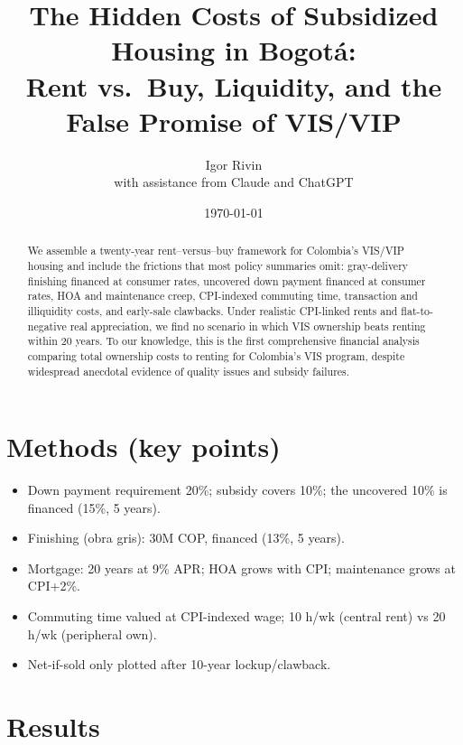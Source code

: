 \documentclass[12pt]{article}
\title{The Hidden Costs of Subsidized Housing in Bogotá:\\
Rent vs.\ Buy, Liquidity, and the False Promise of VIS/VIP}
\author{Igor Rivin\\
\small{with assistance from Claude and ChatGPT}}
\date{\today}
\begin{document}
\maketitle

\begin{abstract}
We assemble a twenty-year rent--versus--buy framework for Colombia's VIS/VIP housing and include the frictions that most policy summaries omit: gray-delivery finishing financed at consumer rates, uncovered down payment financed at consumer rates, HOA and maintenance creep, CPI-indexed commuting time, transaction and illiquidity costs, and early-sale clawbacks. Under realistic CPI-linked rents and flat-to-negative real appreciation, we find no scenario in which VIS ownership beats renting within 20 years. To our knowledge, this is the first comprehensive financial analysis comparing total ownership costs to renting for Colombia's VIS program, despite widespread anecdotal evidence of quality issues and subsidy failures.
\end{abstract}

\section*{Methods (key points)}
\begin{itemize}
  \item Down payment requirement 20\%; subsidy covers 10\%; the uncovered 10\% is financed (15\%, 5 years).
  \item Finishing (obra gris): 30M COP, financed (13\%, 5 years).
  \item Mortgage: 20 years at 9\% APR; HOA grows with CPI; maintenance grows at CPI+2\%.
  \item Commuting time valued at CPI-indexed wage; 10 h/wk (central rent) vs 20 h/wk (peripheral own).
  \item Net-if-sold only plotted after 10-year lockup/clawback.
\end{itemize}

\section*{Results}
\end{document}
